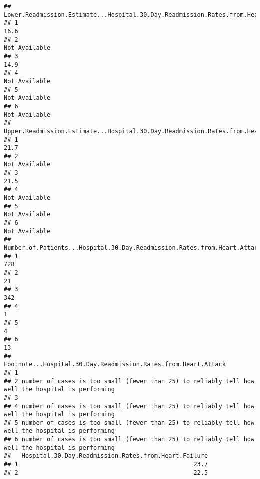\documentclass[
]{article}
\begin{document}
\begin{verbatim}
##   Lower.Readmission.Estimate...Hospital.30.Day.Readmission.Rates.from.Heart.Attack
## 1                                                                             16.6
## 2                                                                    Not Available
## 3                                                                             14.9
## 4                                                                    Not Available
## 5                                                                    Not Available
## 6                                                                    Not Available
##   Upper.Readmission.Estimate...Hospital.30.Day.Readmission.Rates.from.Heart.Attack
## 1                                                                             21.7
## 2                                                                    Not Available
## 3                                                                             21.5
## 4                                                                    Not Available
## 5                                                                    Not Available
## 6                                                                    Not Available
##   Number.of.Patients...Hospital.30.Day.Readmission.Rates.from.Heart.Attack
## 1                                                                      728
## 2                                                                       21
## 3                                                                      342
## 4                                                                        1
## 5                                                                        4
## 6                                                                       13
##                                      Footnote...Hospital.30.Day.Readmission.Rates.from.Heart.Attack
## 1                                                                                                  
## 2 number of cases is too small (fewer than 25) to reliably tell how well the hospital is performing
## 3                                                                                                  
## 4 number of cases is too small (fewer than 25) to reliably tell how well the hospital is performing
## 5 number of cases is too small (fewer than 25) to reliably tell how well the hospital is performing
## 6 number of cases is too small (fewer than 25) to reliably tell how well the hospital is performing
##   Hospital.30.Day.Readmission.Rates.from.Heart.Failure
## 1                                                 23.7
## 2                                                 22.5

\end{verbatim}
\end{document}
